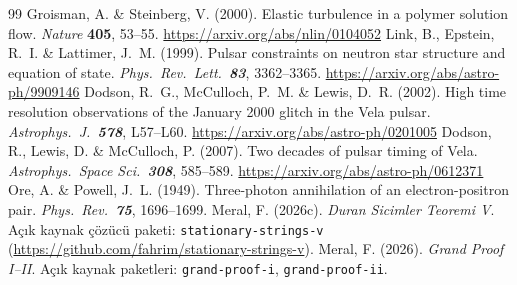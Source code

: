 \documentclass[12pt,a4paper]{article}
\begin{document}
\begin{thebibliography}{99}
     Groisman, A. \& Steinberg, V. (2000). Elastic turbulence in
    a polymer solution flow. \textit{Nature} \textbf{405}, 53--55.
    \url{https://arxiv.org/abs/nlin/0104052}
     Link, B., Epstein, R.~I. \& Lattimer, J.~M. (1999).
    Pulsar constraints on neutron star structure and equation of state.
    \textit{Phys.\ Rev.\ Lett.\ \textbf{83}}, 3362--3365.
    \url{https://arxiv.org/abs/astro-ph/9909146}
     Dodson, R.~G., McCulloch, P.~M. \& Lewis, D.~R. (2002).
    High time resolution observations of the January 2000 glitch in the Vela
    pulsar. \textit{Astrophys.\ J.\ \textbf{578}}, L57--L60.
    \url{https://arxiv.org/abs/astro-ph/0201005}
     Dodson, R., Lewis, D. \& McCulloch, P. (2007). Two decades
    of pulsar timing of Vela. \textit{Astrophys.\ Space Sci.\ \textbf{308}}, 585--589.
    \url{https://arxiv.org/abs/astro-ph/0612371}
     Ore, A. \& Powell, J.~L. (1949). Three-photon annihilation
    of an electron-positron pair. \textit{Phys.\ Rev.\ \textbf{75}}, 1696--1699.
     Meral, F. (2026c). \textit{Duran Sicimler Teoremi V}.
    Açık kaynak çözücü paketi: \texttt{stationary-strings-v}
    (\url{https://github.com/fahrim/stationary-strings-v}).
     Meral, F. (2026). \textit{Grand Proof I--II}.
    Açık kaynak paketleri: \texttt{grand-proof-i}, \texttt{grand-proof-ii}.
\end{thebibliography}
\end{document}
